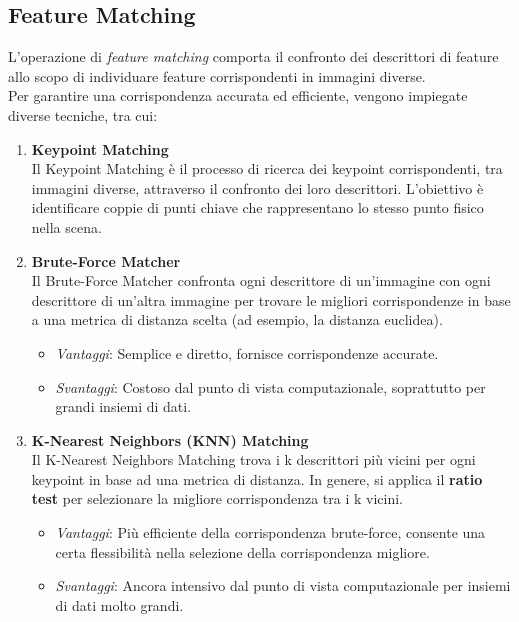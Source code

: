 \documentclass[12pt,a4paper,openright,twoside]{book}
\begin{document}
\subsection{Feature Matching}
L'operazione di {\itshape feature matching} comporta il confronto dei descrittori di feature allo scopo di individuare feature corrispondenti in immagini diverse. \\
Per garantire una corrispondenza accurata ed efficiente, vengono impiegate diverse tecniche, tra cui:

\begin{enumerate}

\item \textbf{Keypoint Matching}\\
Il Keypoint Matching è il processo di ricerca dei keypoint corrispondenti, tra immagini diverse, attraverso il confronto dei loro descrittori. L'obiettivo è identificare coppie di punti chiave che rappresentano lo stesso punto fisico nella scena.

\item \textbf{Brute-Force Matcher}\\
Il Brute-Force Matcher confronta ogni descrittore di un'immagine con ogni descrittore di un'altra immagine per trovare le migliori corrispondenze in base a una metrica di distanza scelta (ad esempio, la distanza euclidea).
\begin{itemize}
\item {\itshape Vantaggi}: Semplice e diretto, fornisce corrispondenze accurate.
\item {\itshape Svantaggi}: Costoso dal punto di vista computazionale, soprattutto per grandi insiemi di dati.
\end{itemize}

\item \textbf{K-Nearest Neighbors (KNN) Matching}\\
Il K-Nearest Neighbors Matching trova i k descrittori più vicini per ogni keypoint in base ad una metrica di distanza. In genere, si applica il \textbf{ratio test} per selezionare la migliore corrispondenza tra i k vicini.
\begin{itemize}
\item {\itshape Vantaggi}: Più efficiente della corrispondenza brute-force, consente una certa flessibilità nella selezione della corrispondenza migliore.
\item {\itshape Svantaggi}: Ancora intensivo dal punto di vista computazionale per insiemi di dati molto grandi.
\end{itemize}


\end{enumerate}
\end{document}

